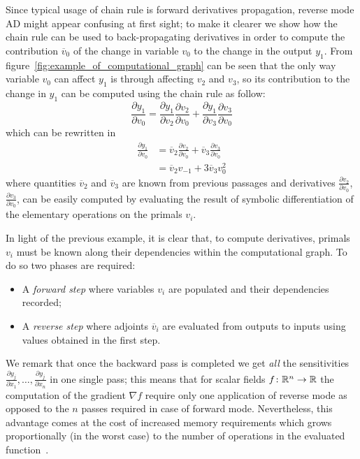 \clearpage

Since typical usage of chain rule is forward derivatives propagation, reverse mode AD might appear confusing at first sight; to make it clearer we show how the chain rule can be used to back-propagating derivatives in order to compute the contribution $\overline{v}_0$ of the change in variable $v_0$ to the change in the output $y_1$. From figure~\ref{fig:example_of_computational_graph} can be seen that the only way variable $v_0$ can affect $y_1$ is through affecting $v_2$ and $v_3$, so its contribution to the change in $y_1$ can be computed using the chain rule as follow:
\begin{equation}
	\frac{\partial y_1}{\partial v_0} = \frac{\partial y_1}{\partial v_2} \frac{\partial v_2}{\partial v_0} + \frac{\partial y_1}{\partial v_3} \frac{\partial v_3}{\partial v_0}
\end{equation}
which can be rewritten in
\begin{equation}
	\begin{split}
		\frac{\partial y_1}{\partial v_0} & = \overline{v}_2 \frac{\partial v_2}{\partial v_0} + \overline{v}_3 \frac{\partial v_3}{\partial v_0}  \\[2ex]
										  & = \overline{v}_2 v_{-1} + 3 \overline{v}_3 v_0^2
	\end{split}
\end{equation}
where quantities $\overline{v}_2$ and $\overline{v}_3$ are known from previous passages and derivatives $\frac{\partial v_2}{\partial v_0}$, $\frac{\partial v_3}{\partial v_0}$, can be easily computed by evaluating the result of symbolic differentiation of the elementary operations on the primals $v_i$.

\medskip
In light of the previous example, it is clear that, to compute derivatives, primals $v_i$ must be known along their dependencies within the computational graph. To do so two phases are required:
\begin{itemize}
	\item A \emph{forward step} where variables $v_i$ are populated and their dependencies recorded;
	\item A \emph{reverse step} where adjoints $\overline{v}_i$ are evaluated from outputs to inputs using values obtained in the first step.
\end{itemize}
We remark that once the backward pass is completed we get \emph{all} the sensitivities $\frac{\partial y_j}{\partial x_1}, \dots, \frac{\partial y_j}{\partial x_n}$ in one single pass; this means that for scalar fields $f \colon \mathbb{R}^n \to \mathbb{R}$ the computation of the gradient $\nabla f$ require only one application of reverse mode as opposed to the $n$ passes required in case of forward mode. Nevertheless, this advantage comes at the cost of increased memory requirements which grows proportionally (in the worst case) to the number of operations in the evaluated function~\cite{Baydin:AD_survey}.

